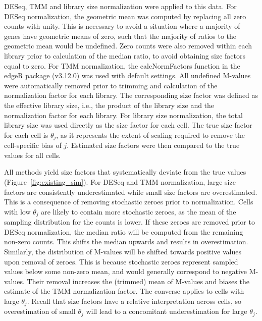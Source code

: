 \documentclass{article}
\begin{document}
DESeq, TMM and library size normalization were applied to this data.
For DESeq normalization, the geometric mean was computed by replacing all zero counts with unity.
This is necessary to avoid a situation where a majority of genes have geometric means of zero, such that the majority of ratios to the geometric mean would be undefined.
Zero counts were also removed within each library prior to calculation of the median ratio, to avoid obtaining size factors equal to zero.
For TMM normalization, the calcNormFactors function in the edgeR package (v3.12.0) was used with default settings.
All undefined M-values were automatically removed prior to trimming and calculation of the normalization factor for each library.
The corresponding size factor was defined as the effective library size, i.e., the product of the library size and the normalization factor for each library.
For library size normalization, the total library size was used directly as the size factor for each cell.
The true size factor for each cell is $\theta_j$, as it represents the extent of scaling required to remove the cell-specific bias of $j$.
Estimated size factors were then compared to the true values for all cells.

All methods yield size factors that systematically deviate from the true values (Figure~\ref{fig:existing_sim}).
For DESeq and TMM normalization, large size factors are consistently underestimated while small size factors are overestimated.
This is a consequence of removing stochastic zeroes prior to normalization.
Cells with low $\theta_j$ are likely to contain more stochastic zeroes, as the mean of the sampling distribution for the counts is lower.
If these zeroes are removed prior to DESeq normalization, the median ratio will be computed from the remaining non-zero counts.
This shifts the median upwards and results in overestimation.
Similarly, the distribution of M-values will be shifted towards positive values upon removal of zeroes.
This is because stochastic zeroes represent sampled values below some non-zero mean, and would generally correspond to negative M-values.
Their removal increases the (trimmed) mean of M-values and biases the estimate of the TMM normalization factor.
The converse applies to cells with large $\theta_j$.
Recall that size factors have a relative interpretation across cells, so overestimation of small $\theta_j$ will lead to a concomitant underestimation for large $\theta_j$.
\end{document}
